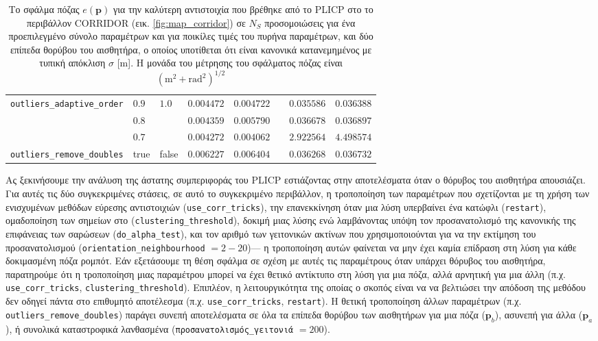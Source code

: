 \begin{table*}
\begin{tabular}{lll|rrr|rr}
  \texttt{outliers\_adaptive\_order}  & $0.9$   & $1.0$     & $0.004472$        & $0.004722$        &  & $0.035586$         & $0.036388$       \\
                                      & $0.8$   &           & $0.004359$        & $0.005790$        &  & $0.036678$         & $0.036897$       \\
                                      & $0.7$   &           & $0.004272$        & $0.004062$        &  & $2.922564$         & $4.498574$       \\
  \texttt{outliers\_remove\_doubles}  & true    & false     & $0.006227$        & $0.006404$        &  & $0.036268$         & $0.036732$       \\
\bottomrule
\end{tabular}
\caption{\small Το σφάλμα πόζας $e(\bm{p})$ για την καλύτερη αντιστοιχία που βρέθηκε από το PLICP στο
         το περιβάλλον CORRIDOR (εικ. \ref{fig:map_corridor}) σε $N_S$
         προσομοιώσεις για ένα προεπιλεγμένο σύνολο παραμέτρων και για ποικίλες τιμές του πυρήνα
         παραμέτρων, και δύο επίπεδα θορύβου του αισθητήρα, ο οποίος υποτίθεται ότι είναι
         κανονικά κατανεμημένος με τυπική απόκλιση $\sigma$ [m]. Η μονάδα του
         μέτρησης του σφάλματος πόζας είναι $(\text{m}^2+\text{rad}^2)^{1/2}$}
\label{tbl:csm_diff_params}
\end{table*}


Ας ξεκινήσουμε την ανάλυση της άστατης συμπεριφοράς του PLICP εστιάζοντας στην
αποτελέσματα όταν ο θόρυβος του αισθητήρα απουσιάζει. Για αυτές τις δύο συγκεκριμένες στάσεις, σε αυτό το
συγκεκριμένο περιβάλλον, η τροποποίηση των παραμέτρων που σχετίζονται με τη χρήση των ενισχυμένων
μεθόδων εύρεσης αντιστοιχιών (\texttt{use\_corr\_tricks}), την επανεκκίνηση
όταν μια λύση υπερβαίνει ένα κατώφλι (\texttt{restart}), ομαδοποίηση των σημείων στο
(\texttt{clustering\_threshold}), δοκιμή μιας λύσης ενώ
λαμβάνοντας υπόψη τον προσανατολισμό της κανονικής της επιφάνειας των σαρώσεων
(\texttt{do\_alpha\_test}), και τον αριθμό των γειτονικών ακτίνων που χρησιμοποιούνται για να
την εκτίμηση του προσανατολισμού
(\texttt{orientation\_neighbourhood} $=2-20$)--- η τροποποίηση αυτών φαίνεται να μην έχει καμία
επίδραση στη λύση για κάθε δοκιμασμένη πόζα ρομπότ. Εάν εξετάσουμε τη θέση
σφάλμα σε σχέση με αυτές τις παραμέτρους όταν υπάρχει θόρυβος του αισθητήρα, παρατηρούμε
ότι η τροποποίηση μιας παραμέτρου μπορεί να έχει θετικό αντίκτυπο στη λύση για
μια πόζα, αλλά αρνητική για μια άλλη (π.χ. \texttt{use\_corr\_tricks},
\texttt{clustering\_threshold}). Επιπλέον, η λειτουργικότητα της οποίας ο σκοπός είναι να
να βελτιώσει την απόδοση της μεθόδου δεν οδηγεί πάντα στο επιθυμητό αποτέλεσμα
(π.χ. \texttt{use\_corr\_tricks}, \texttt{restart}). Η θετική τροποποίηση
άλλων παραμέτρων (π.χ. \texttt{outliers\_remove\_doubles}) παράγει
συνεπή αποτελέσματα σε όλα τα επίπεδα θορύβου των αισθητήρων για μια πόζα ($\bm{p}_b$),
ασυνεπή για άλλα ($\bm{p}_a$), ή συνολικά καταστροφικά λανθασμένα
(\texttt{προσανατολισμός\_γειτονιά} $=200$).





